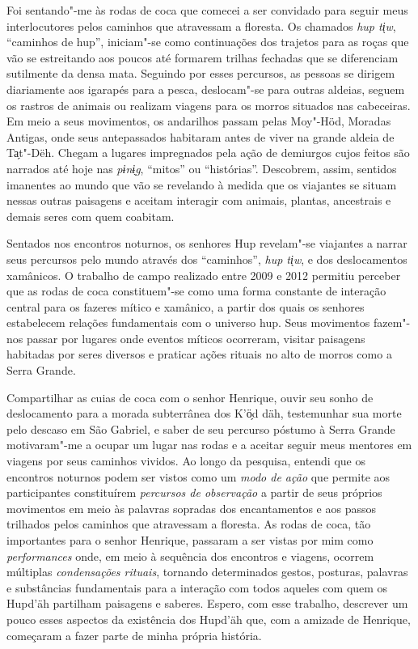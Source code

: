 Foi sentando"-me às rodas de coca que comecei a ser convidado para seguir
meus interlocutores pelos caminhos que atravessam a floresta. Os
chamados \textit{hup ti̖w}, ``caminhos de hup'', iniciam"-se como continuações
dos trajetos para as roças que vão se estreitando aos poucos até
formarem trilhas fechadas que se diferenciam sutilmente da densa mata.
Seguindo por esses percursos, as pessoas se dirigem diariamente aos
igarapés para a pesca, deslocam"-se para outras aldeias, seguem os
rastros de animais ou realizam viagens para os morros situados nas
cabeceiras. Em meio a seus movimentos, os andarilhos passam pelas
Moy"-Höd, Moradas Antigas, onde seus antepassados habitaram antes
de viver na grande aldeia de Ta̗t"-Dëh. Chegam a lugares impregnados
pela ação de demiurgos cujos feitos são narrados até hoje nas \textit{pɨnɨ̖g},
``mitos'' ou ``histórias''. Descobrem, assim, sentidos imanentes ao mundo que
vão se revelando à medida que os viajantes se situam nessas outras
paisagens e aceitam interagir com animais, plantas, ancestrais e demais
seres com quem coabitam.

Sentados nos encontros noturnos, os senhores Hup revelam"-se viajantes a
narrar seus percursos pelo mundo através dos ``caminhos'', \textit{hup ti̖w}, e
dos deslocamentos xamânicos. O trabalho de campo realizado entre 2009 e
2012 permitiu perceber que as rodas de coca constituem"-se como uma forma
constante de interação central para os fazeres mítico e xamânico, a
partir dos quais os senhores estabelecem relações fundamentais com o
universo hup. Seus movimentos fazem"-nos passar por lugares onde eventos
míticos ocorreram, visitar paisagens habitadas por seres diversos e
praticar ações rituais no alto de morros como a Serra Grande.

Compartilhar as cuias de coca com o senhor Henrique, ouvir seu sonho de
deslocamento para a morada subterrânea dos K'ö̗d däh, testemunhar sua
morte pelo descaso em São Gabriel, e saber de seu percurso póstumo à
Serra Grande motivaram"-me a ocupar um lugar nas rodas e a aceitar seguir
meus mentores em viagens por seus caminhos vividos. Ao longo da
pesquisa, entendi que os encontros noturnos podem ser vistos como um
\textit{modo de ação} que permite aos participantes constituírem
\textit{percursos de observação} a partir de seus próprios movimentos em
meio às palavras sopradas dos encantamentos e aos passos trilhados pelos
caminhos que atravessam a floresta. As rodas de coca, tão importantes
para o senhor Henrique, passaram a ser vistas por mim como
\textit{performances} onde, em meio à sequência dos encontros e viagens,
ocorrem múltiplas \textit{condensações rituais}, tornando determinados
gestos, posturas, palavras e substâncias fundamentais para a interação
com todos aqueles com quem os Hupd'äh partilham paisagens e saberes.
Espero, com esse trabalho, descrever um pouco esses aspectos da
existência dos Hupd'äh que, com a amizade de Henrique, começaram a fazer
parte de minha própria história.

